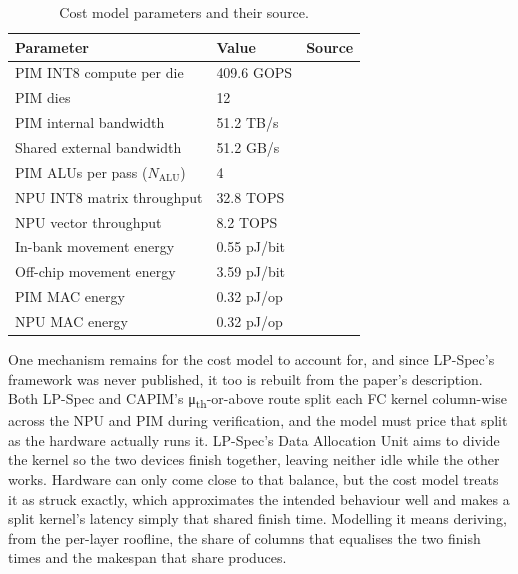 \documentclass[11pt]{article}
\begin{document}
\begin{table}[H]
\centering
\footnotesize
\begin{tabular}{lll}
\toprule
Parameter & Value & Source \\
\midrule
PIM INT8 compute per die & 409.6 GOPS & \cite{he2025lpspec} \\
PIM dies & 12 & \cite{he2025lpspec} \\
PIM internal bandwidth & 51.2 TB/s & \cite{he2025lpspec} \\
Shared external bandwidth & 51.2 GB/s & \cite{he2025lpspec} \\
PIM ALUs per pass ($N_{\text{ALU}}$) & 4 & \cite{he2025lpspec} \\
NPU INT8 matrix throughput & 32.8 TOPS & \cite{he2025lpspec} \\
NPU vector throughput & 8.2 TOPS & \cite{he2025lpspec} \\
In-bank movement energy & 0.55 pJ/bit & \cite{park2024attacc} \\
Off-chip movement energy & 3.59 pJ/bit & \cite{park2024attacc} \\
PIM MAC energy & 0.32 pJ/op & \cite{park2024attacc} \\
NPU MAC energy & 0.32 pJ/op & \cite{park2024attacc} \\
\bottomrule
\end{tabular}
\caption{Cost model parameters and their source.}
\label{tab:costparams}
\end{table}

One mechanism remains for the cost model to account for, and since LP-Spec's framework was never published, it too is rebuilt from the paper's description. Both LP-Spec and CAPIM's μ\textsubscript{th}-or-above route split each FC kernel column-wise across the NPU and PIM during verification, and the model must price that split as the hardware actually runs it. LP-Spec's Data Allocation Unit aims to divide the kernel so the two devices finish together, leaving neither idle while the other works. Hardware can only come close to that balance, but the cost model treats it as struck exactly, which approximates the intended behaviour well and makes a split kernel's latency simply that shared finish time. Modelling it means deriving, from the per-layer roofline, the share of columns that equalises the two finish times and the makespan that share produces.
\end{document}
